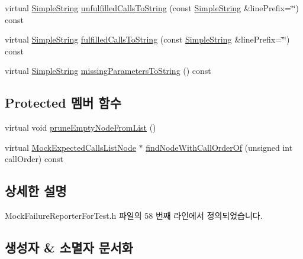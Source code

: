 \begin{DoxyCompactItemize}
\item 
virtual \hyperlink{class_simple_string}{Simple\+String} \hyperlink{class_mock_expected_calls_list_a81cdcb1eb8447b6835fd9c81df9cfa4e}{unfulfilled\+Calls\+To\+String} (const \hyperlink{class_simple_string}{Simple\+String} \&line\+Prefix=\char`\"{}\char`\"{}) const 
\item 
virtual \hyperlink{class_simple_string}{Simple\+String} \hyperlink{class_mock_expected_calls_list_a66959cff61f39f0857b2523e000c1e8c}{fulfilled\+Calls\+To\+String} (const \hyperlink{class_simple_string}{Simple\+String} \&line\+Prefix=\char`\"{}\char`\"{}) const 
\item 
virtual \hyperlink{class_simple_string}{Simple\+String} \hyperlink{class_mock_expected_calls_list_a191036eb1f8823286092ad3519820b38}{missing\+Parameters\+To\+String} () const 
\end{DoxyCompactItemize}
\subsection*{Protected 멤버 함수}
\begin{DoxyCompactItemize}
\item 
virtual void \hyperlink{class_mock_expected_calls_list_aeb4c1dd9901800365e942770b132c94b}{prune\+Empty\+Node\+From\+List} ()
\item 
virtual \hyperlink{class_mock_expected_calls_list_1_1_mock_expected_calls_list_node}{Mock\+Expected\+Calls\+List\+Node} $\ast$ \hyperlink{class_mock_expected_calls_list_ac9399ef4ecb1468ef6e350629bdecc39}{find\+Node\+With\+Call\+Order\+Of} (unsigned int call\+Order) const 
\end{DoxyCompactItemize}


\subsection{상세한 설명}


Mock\+Failure\+Reporter\+For\+Test.\+h 파일의 58 번째 라인에서 정의되었습니다.



\subsection{생성자 \& 소멸자 문서화}
